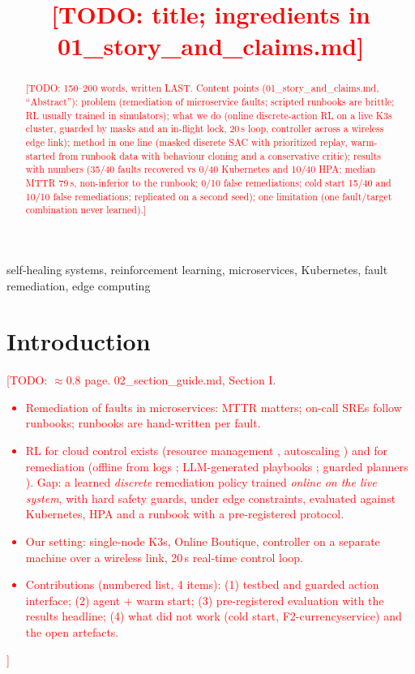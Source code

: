 \documentclass[conference,10pt]{IEEEtran}
\newcommand{\todo}[1]{\textcolor{red}{[TODO: #1]}}
\begin{document}
\title{\todo{title; ingredients in 01\_story\_and\_claims.md}}

\author{\IEEEauthorblockN{\todo{authors}}
\IEEEauthorblockA{\todo{affiliation}}}

\maketitle

\begin{abstract}
\todo{150--200 words, written LAST. Content points (01\_story\_and\_claims.md, ``Abstract''):
problem (remediation of microservice faults; scripted runbooks are brittle; RL usually trained in simulators);
what we do (online discrete-action RL on a live K3s cluster, guarded by masks and an in-flight lock, 20\,s loop, controller across a wireless edge link);
method in one line (masked discrete SAC with prioritized replay, warm-started from runbook data with behaviour cloning and a conservative critic);
results with numbers (35/40 faults recovered vs 0/40 Kubernetes and 10/40 HPA; median MTTR 79\,s, non-inferior to the runbook; 0/10 false remediations; cold start 15/40 and 10/10 false remediations; replicated on a second seed);
one limitation (one fault/target combination never learned).}
\end{abstract}

\begin{IEEEkeywords}
self-healing systems, reinforcement learning, microservices, Kubernetes, fault remediation, edge computing
\end{IEEEkeywords}

\section{Introduction}\label{sec:intro}
\todo{$\approx$0.8 page. 02\_section\_guide.md, Section I.
\begin{itemize}
\item Remediation of faults in microservices: MTTR matters; on-call SREs follow runbooks; runbooks are hand-written per fault.
\item RL for cloud control exists (resource management \cite{qiu2020firm,zhang2021sinan}, autoscaling \cite{qiu2023aware}) and for remediation (offline from logs \cite{dai2026saferemediation}; LLM-generated playbooks \cite{zhang2026e2ereme}; guarded planners \cite{habibi2026arbiter,cai2026guardedact}). Gap: a learned \emph{discrete} remediation policy trained \emph{online on the live system}, with hard safety guards, under edge constraints, evaluated against Kubernetes, HPA and a runbook with a pre-registered protocol.
\item Our setting: single-node K3s, Online Boutique, controller on a separate machine over a wireless link, 20\,s real-time control loop.
\item Contributions (numbered list, 4 items): (1) testbed and guarded action interface; (2) agent + warm start; (3) pre-registered evaluation with the results headline; (4) what did not work (cold start, F2-currencyservice) and the open artefacts.
\end{itemize}}
\end{document}
